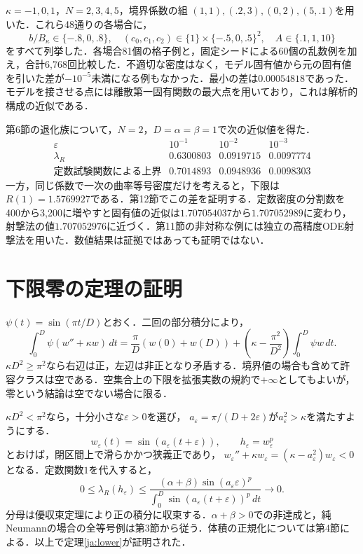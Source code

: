 \documentclass[12pt]{amsart}
\theoremstyle{definition}
\theoremstyle{remark}
\numberwithin{equation}{section}
\begin{document}
$\kappa=-1,0,1$，$N=2,3,4,5$，境界係数の組
$(1,1),(.2,3),(0,2),(5,.1)$を用いた．これら48通りの各場合に，
\[
 b/B_\kappa\in\{-.8,0,.8\},\quad
 (c_0,c_1,c_2)\in\{1\}\times\{-.5,0,.5\}^2,\quad A\in\{.1,1,10\}
\]
をすべて列挙した．各場合81個の格子例と，固定シードによる60個の乱数例を加え，合計6,768回比較した．不適切な密度はなく，モデル固有値から元の固有値を引いた差が$-10^{-5}$未満になる例もなかった．最小の差は$0.00054818$であった．モデルを接させる点には離散第一固有関数の最大点を用いており，これは解析的構成の近似である．

第6節の退化族について，$N=2$，$D=\alpha=\beta=1$で次の近似値を得た．
\[
\begin{array}{c|ccc}
 \varepsilon&10^{-1}&10^{-2}&10^{-3}\\\hline
 \lambda_R&0.6300803&0.0919715&0.0097774\\
 \text{定数試験関数による上界}&0.7014893&0.0948936&0.0098303
\end{array}
\]
一方，同じ係数で一次の曲率等号密度だけを考えると，下限は$R(1)=1.5769927$である．第12節でこの差を証明する．定数密度の分割数を400から3,200に増やすと固有値の近似は$1.707054037$から$1.707052989$に変わり，射撃法の値$1.707052976$に近づく．第11節の非対称な例には独立の高精度ODE射撃法を用いた．数値結果は証拠ではあっても証明ではない．

\section{下限零の定理の証明}
$\psi(t)=\sin(\pi t/D)$とおく．二回の部分積分により，
\[
 \int_0^D\psi(w''+\kappa w)\,dt
 =\frac\pi D(w(0)+w(D))+
 \left(\kappa-\frac{\pi^2}{D^2}\right)\int_0^D\psi w\,dt.
\]
$\kappa D^2\ge\pi^2$なら右辺は正，左辺は非正となり矛盾する．境界値の場合も含めて許容クラスは空である．空集合上の下限を拡張実数の規約で$+\infty$としてもよいが，零という結論は空でない場合に限る．

$\kappa D^2<\pi^2$なら，十分小さな$\varepsilon>0$を選び，
$a_\varepsilon=\pi/(D+2\varepsilon)$が$a_\varepsilon^2>\kappa$を満たすようにする．
\[
 w_\varepsilon(t)=\sin(a_\varepsilon(t+\varepsilon)),\qquad
 h_\varepsilon=w_\varepsilon^p
\]
とおけば，閉区間上で滑らかかつ狭義正であり，
$w_\varepsilon''+\kappa w_\varepsilon=(\kappa-a_\varepsilon^2)w_\varepsilon<0$となる．定数関数$1$を代入すると，
\[
 0\le\lambda_R(h_\varepsilon)\le
 \frac{(\alpha+\beta)\sin(a_\varepsilon\varepsilon)^p}
 {\int_0^D\sin(a_\varepsilon(t+\varepsilon))^p\,dt}\longrightarrow0.
\]
分母は優収束定理により正の積分に収束する．$\alpha+\beta>0$での非達成と，純Neumannの場合の全等号例は第3節から従う．体積の正規化については第4節による．以上で定理\ref{ja:lower}が証明された．
\end{document}
